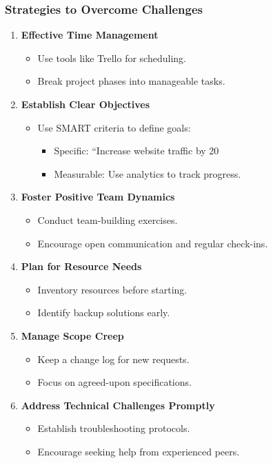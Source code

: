 \documentclass[aspectratio=169]{beamer}
\begin{document}
\begin{frame}[fragile]
  \frametitle{Strategies to Overcome Challenges}
  \begin{enumerate}
    \item \textbf{Effective Time Management}
      \begin{itemize}
        \item Use tools like Trello for scheduling.
        \item Break project phases into manageable tasks.
      \end{itemize}

    \item \textbf{Establish Clear Objectives}
      \begin{itemize}
        \item Use SMART criteria to define goals:
          \begin{itemize}
            \item Specific: ``Increase website traffic by 20%
            \item Measurable: Use analytics to track progress.
          \end{itemize}
      \end{itemize}

    \item \textbf{Foster Positive Team Dynamics}
      \begin{itemize}
        \item Conduct team-building exercises.
        \item Encourage open communication and regular check-ins.
      \end{itemize}

    \item \textbf{Plan for Resource Needs}
      \begin{itemize}
        \item Inventory resources before starting.
        \item Identify backup solutions early.
      \end{itemize}

    \item \textbf{Manage Scope Creep}
      \begin{itemize}
        \item Keep a change log for new requests.
        \item Focus on agreed-upon specifications.
      \end{itemize}

    \item \textbf{Address Technical Challenges Promptly}
      \begin{itemize}
        \item Establish troubleshooting protocols.
        \item Encourage seeking help from experienced peers.
      \end{itemize}
  \end{enumerate}
\end{frame}
\end{document}
